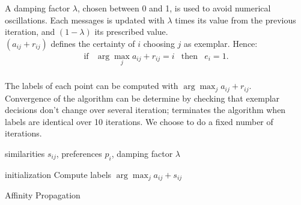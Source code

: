 \documentclass{ipol}
\begin{document}
A damping factor $\lambda$, chosen between 0 and 1, is used to avoid
numerical oscillations. Each messages is updated with $\lambda$ times its
value from the previous iteration, and $(1 - \lambda)$ its prescribed value.
\\

$(a_{ij} + r_{ij})$ defines the certainty of $i$ choosing $j$ as exemplar.
Hence:
\begin{equation*}
\begin{array}{cccc}
\text{if} & \arg \max_j a_{ij} + r_{ij} = i & \text{then} & e_i = 1. \\
\end{array}
\end{equation*}

The labels of each point can be computed with $\arg \max_j a_{ij} + r_{ij}$.
\\

Convergence of the algorithm can be determine by checking that exemplar
decisions don't change over several iteration;
\cite{frey07affinitypropagation} terminates the algorithm when labels are
identical over 10 iterations. We choose to do a fixed number of iterations.

\begin{algorithm}[h]
  \SetLine
  similarities $s_{ij}$, preferences $p_i$, damping factor $\lambda$ \;

  initialization\;
  Compute labels $\arg \max_{j} a_{ij} + s_{ij}$ \;
  \caption{Affinity Propagation}
\end{algorithm}
\end{document}
